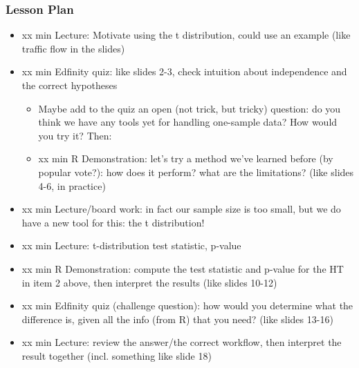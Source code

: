 \begin{frame}
    \frametitle{Lesson Plan}
    \begin{itemize}
        \item xx min Lecture: Motivate using the t distribution, could use an example (like traffic flow in the slides)
        \item xx min Edfinity quiz: like slides 2-3, check intuition about independence and the correct hypotheses
        \begin{itemize}
            \item Maybe add to the quiz an open (not trick, but tricky) question: do you think we have any tools yet for handling one-sample data? How would you try it? Then:
            \item xx min R Demonstration: let's try a method we've learned before (by popular vote?): how does it perform? what are the limitations? (like slides 4-6, in practice)
        \end{itemize}
        \item xx min Lecture/board work: in fact our sample size is too small, but we do have a new tool for this: the t distribution!
        \item xx min Lecture: t-distribution test statistic, p-value
        \item xx min R Demonstration: compute the test statistic and p-value for the HT in item 2 above, then interpret the results (like slides 10-12)
        \item xx min Edfinity quiz (challenge question): how would you determine what the difference is, given all the info (from R) that you need? (like slides 13-16)
        \item xx min Lecture: review the answer/the correct workflow, then interpret the result together (incl. something like slide 18)
    \end{itemize}
\end{frame}
            
